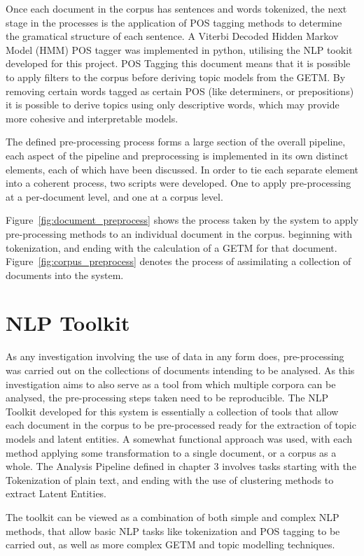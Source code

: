 \documentclass[10pt]{report}
\begin{document}
Once each document in the corpus has sentences and words tokenized, the next stage in the processes is the application of POS tagging methods to determine the gramatical structure of each sentence. A Viterbi Decoded Hidden Markov Model (HMM) POS tagger was implemented in python, utilising the NLP tookit developed for this project. POS Tagging this document means that it is possible to apply filters to the corpus before deriving topic models from the GETM. By removing certain words tagged as certain POS (like determiners, or prepositions) it is possible to derive topics using only descriptive words, which may provide more cohesive and interpretable models.

The defined pre-processing process forms a large section of the overall pipeline, each aspect of the pipeline and preprocessing is implemented in its own distinct elements, each of which have been discussed. In order to tie each separate element into a coherent process, two scripts were developed. One to apply pre-processing at a per-document level, and one at a corpus level.

Figure~\ref{fig:document_preprocess} shows the process taken by the system to apply pre-processing methods to an individual document in the corpus. beginning with tokenization, and ending with the calculation of a GETM for that document. Figure~\ref{fig:corpus_preprocess} denotes the process of assimilating a collection of documents into the system.


\section{NLP Toolkit}
As any investigation involving the use of data in any form does, pre-processing was carried out on the collections of documents intending to be analysed. As this investigation aims to also serve as a tool from which multiple corpora can be analysed, the pre-processing steps taken need to be reproducible. The NLP Toolkit developed for this system is essentially a collection of tools that allow each document in the corpus to be pre-processed ready for the extraction of topic models and latent entities. A somewhat functional approach was used, with each method applying some transformation to a single document, or a corpus as a whole. The Analysis Pipeline defined in chapter 3 involves tasks starting with the Tokenization of plain text, and ending with the use of clustering methods to extract Latent Entities.

The toolkit can be viewed as a combination of both simple and complex NLP methods, that allow basic NLP tasks like tokenization and POS tagging to be carried out, as well as more complex GETM and topic modelling techniques.
\end{document}
